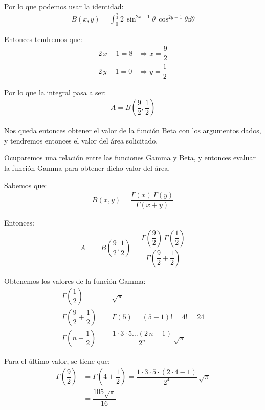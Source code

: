 Por lo que podemos usar la identidad:
\begin{align*}
B(x, y) = \int_{0}^\frac{\pi}{2} 2 \, \sin^{2x-1} \theta \, \cos^{2y-1} \theta \dd{\theta}
\end{align*}

Entonces tendremos que:
\begin{align*}
2 \, x - 1 = 8 &\Rightarrow x = \dfrac{9}{2} \\[0.5em]
2 \, y - 1 = 0 &\Rightarrow y = \dfrac{1}{2}
\end{align*}

Por lo que la integral pasa a ser:
\begin{align*}
A = B \left( \dfrac{9}{2},\dfrac{1}{2} \right)
\end{align*}

Nos queda entonces obtener el valor de la función Beta con los argumentos dados, y tendremos entonces el valor del área solicitado.
\par
Ocuparemos una relación entre las funciones Gamma y Beta, y entonces evaluar la función Gamma para obtener dicho valor del área.
\par
Sabemos que:
\begin{align*}
B (x, y) = \dfrac{\Gamma (x) \, \Gamma (y)}{\Gamma (x + y)}
\end{align*}

Entonces:
\begin{align*}
A &= B \left( \dfrac{9}{2},\dfrac{1}{2} \right) = \dfrac{\Gamma \left(\dfrac{9}{2} \right) \, \Gamma \left(\dfrac{1}{2} \right)}{\Gamma \left(\dfrac{9}{2} + \dfrac{1}{2} \right)}
\end{align*}

Obtenemos los valores de la función Gamma:
\begin{align*}
\Gamma \left( \dfrac{1}{2} \right) &= \sqrt{\pi} \\[0.5em] 
\Gamma \left( \dfrac{9}{2} + \dfrac{1}{2} \right) &= \Gamma (5) = (5 - 1)! = 4! = 24 \\[0.5em] 
\Gamma \left(n + \dfrac{1}{2}\right) &= \dfrac{1 \cdot 3 \cdot 5 \ldots (2 \, n - 1)}{2^{n}} \, \sqrt{\pi} 
\end{align*}

Para el último valor, se tiene que:
\begin{align*}
\Gamma \left( \dfrac{9}{2}\right) &=  \Gamma \left(4 + \dfrac{1}{2}\right) = \dfrac{1 \cdot 3 \cdot 5 \cdot (2 \cdot 4 - 1)}{2^{4}} \, \sqrt{\pi} \\[1em]
&= \dfrac{105 \sqrt{\pi}}{16}
\end{align*}

